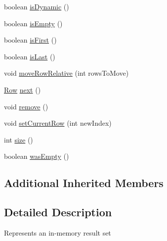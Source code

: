 \begin{DoxyCompactItemize}
\item 
boolean \mbox{\hyperlink{classcom_1_1mysql_1_1cj_1_1protocol_1_1a_1_1result_1_1_resultset_rows_static_acf9221e596a879c793000246688ff8f6}{is\+Dynamic}} ()
\item 
boolean \mbox{\hyperlink{classcom_1_1mysql_1_1cj_1_1protocol_1_1a_1_1result_1_1_resultset_rows_static_a6e253f009ce83647195f60954d021cff}{is\+Empty}} ()
\item 
boolean \mbox{\hyperlink{classcom_1_1mysql_1_1cj_1_1protocol_1_1a_1_1result_1_1_resultset_rows_static_ad16947839519d3bf8c5bc679f6920b5c}{is\+First}} ()
\item 
boolean \mbox{\hyperlink{classcom_1_1mysql_1_1cj_1_1protocol_1_1a_1_1result_1_1_resultset_rows_static_a2714d5e0fe10d3cb3b148a3fb2d6fec4}{is\+Last}} ()
\item 
void \mbox{\hyperlink{classcom_1_1mysql_1_1cj_1_1protocol_1_1a_1_1result_1_1_resultset_rows_static_ac6527b7e8cbc7cb3ec0c67c854f145b7}{move\+Row\+Relative}} (int rows\+To\+Move)
\item 
\mbox{\hyperlink{interfacecom_1_1mysql_1_1cj_1_1result_1_1_row}{Row}} \mbox{\hyperlink{classcom_1_1mysql_1_1cj_1_1protocol_1_1a_1_1result_1_1_resultset_rows_static_a98819686c338cde8d042994ebfda2345}{next}} ()
\item 
void \mbox{\hyperlink{classcom_1_1mysql_1_1cj_1_1protocol_1_1a_1_1result_1_1_resultset_rows_static_a211c7a73662f04b4a0a47d8de92041f5}{remove}} ()
\item 
void \mbox{\hyperlink{classcom_1_1mysql_1_1cj_1_1protocol_1_1a_1_1result_1_1_resultset_rows_static_a6975dcd56b2033fcfc7dbfe7a4fa83d8}{set\+Current\+Row}} (int new\+Index)
\item 
int \mbox{\hyperlink{classcom_1_1mysql_1_1cj_1_1protocol_1_1a_1_1result_1_1_resultset_rows_static_a1063d6dd64edbd0a400922e9c371ff5f}{size}} ()
\item 
boolean \mbox{\hyperlink{classcom_1_1mysql_1_1cj_1_1protocol_1_1a_1_1result_1_1_resultset_rows_static_ad18792e2f43667c3dc0b6e41a6de3026}{was\+Empty}} ()
\end{DoxyCompactItemize}
\subsection*{Additional Inherited Members}


\subsection{Detailed Description}
Represents an in-\/memory result set 

